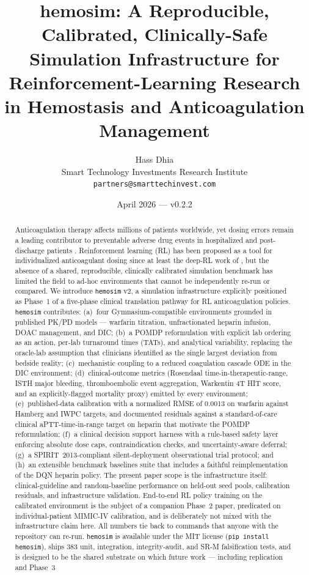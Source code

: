 \documentclass[11pt]{article}
\title{\textbf{hemosim}: A Reproducible, Calibrated, Clinically-Safe\\
Simulation Infrastructure for Reinforcement-Learning Research\\
in Hemostasis and Anticoagulation Management}
\author{
  Hass Dhia\\
  Smart Technology Investments Research Institute\\
  \texttt{partners@smarttechinvest.com}
}
\date{April 2026 --- v0.2.2}
\begin{document}
\maketitle

\begin{abstract}
Anticoagulation therapy affects millions of patients worldwide, yet dosing errors remain a leading contributor to preventable adverse drug events in hospitalized and post-discharge patients \citep{budnitz2011}. Reinforcement learning (RL) has been proposed as a tool for individualized anticoagulant dosing since at least the deep-RL work of \citet{nemati2016}, but the absence of a shared, reproducible, clinically calibrated simulation benchmark has limited the field to ad-hoc environments that cannot be independently re-run or compared. We introduce \texttt{hemosim} v2, a simulation infrastructure explicitly positioned as Phase~1 of a five-phase clinical translation pathway for RL anticoagulation policies. \texttt{hemosim} contributes: (a)~four Gymnasium-compatible environments grounded in published PK/PD models --- warfarin titration, unfractionated heparin infusion, DOAC management, and DIC; (b)~a POMDP reformulation with explicit lab ordering as an action, per-lab turnaround times (TATs), and analytical variability, replacing the oracle-lab assumption that clinicians identified as the single largest deviation from bedside reality; (c)~mechanistic coupling to a reduced coagulation cascade ODE in the DIC environment; (d)~clinical-outcome metrics (Rosendaal time-in-therapeutic-range, ISTH major bleeding, thromboembolic event aggregation, Warkentin 4T HIT score, and an explicitly-flagged mortality proxy) emitted by every environment; (e)~published-data calibration with a normalized RMSE of 0.0013 on warfarin against Hamberg \citep{hamberg2007} and IWPC \citep{iwpc2009} targets, and documented residuals against a standard-of-care clinical aPTT-time-in-range target on heparin that motivate the POMDP reformulation; (f)~a clinical decision support harness with a rule-based safety layer enforcing absolute dose caps, contraindication checks, and uncertainty-aware deferral; (g)~a SPIRIT~2013-compliant silent-deployment observational trial protocol; and (h)~an extensible benchmark baselines suite that includes a faithful reimplementation of the \citet{nemati2016} DQN heparin policy. The present paper scope is the infrastructure itself: clinical-guideline and random-baseline performance on held-out seed pools, calibration residuals, and infrastructure validation. End-to-end RL policy training on the calibrated environment is the subject of a companion Phase~2 paper, predicated on individual-patient MIMIC-IV calibration, and is deliberately not mixed with the infrastructure claim here. All numbers tie back to commands that anyone with the repository can re-run. \texttt{hemosim} is available under the MIT license (\texttt{pip install hemosim}), ships 383 unit, integration, integrity-audit, and SR-M falsification tests, and is designed to be the shared substrate on which future work --- including \citet{nemati2016} replication and Phase~3 
\end{abstract}
\end{document}

